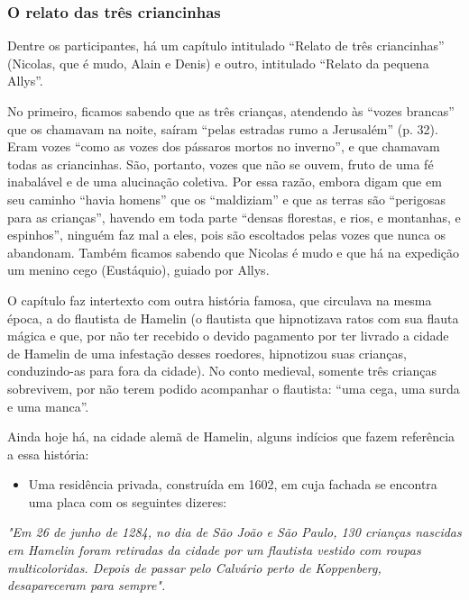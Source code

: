 \documentclass[12pt]{extarticle}
\begin{document}
\subsubsection{O relato das três criancinhas}

Dentre os participantes, há um capítulo intitulado ``Relato de três
criancinhas'' (Nicolas, que é mudo, Alain e Denis) e outro, intitulado
``Relato da pequena Allys''.

No primeiro, ficamos sabendo que as três crianças, atendendo às ``vozes
brancas'' que os chamavam na noite, saíram ``pelas estradas rumo a
Jerusalém'' (p. 32). Eram vozes ``como as vozes dos pássaros mortos no
inverno'', e que chamavam todas as criancinhas. São, portanto, vozes que
não se ouvem, fruto de uma fé inabalável e de uma alucinação coletiva.
Por essa razão, embora digam que em seu caminho ``havia homens'' que os
``maldiziam'' e que as terras são ``perigosas para as crianças'',
havendo em toda parte ``densas florestas, e rios, e montanhas, e
espinhos'', ninguém faz mal a eles, pois são escoltados pelas vozes que
nunca os abandonam. Também ficamos sabendo que Nicolas é mudo e que há
na expedição um menino cego (Eustáquio), guiado por Allys.

O capítulo faz intertexto com outra história famosa, que circulava na
mesma época, a do flautista de Hamelin (o flautista que hipnotizava
ratos com sua flauta mágica e que, por não ter recebido o devido
pagamento por ter livrado a cidade de Hamelin de uma infestação desses
roedores, hipnotizou suas crianças, conduzindo-as para fora da cidade).
No conto medieval, somente três crianças sobrevivem, por não terem
podido acompanhar o flautista: ``uma cega, uma surda e uma manca''.




Ainda hoje há, na cidade alemã de Hamelin, alguns indícios que fazem
referência a essa história:

\begin{itemize}
\item
  Uma residência privada, construída em 1602, em cuja fachada se
  encontra uma placa com os seguintes dizeres:
\end{itemize}

\emph{"Em 26 de junho de 1284, no dia de São João e São Paulo, 130
crianças nascidas em Hamelin foram retiradas da cidade por um flautista
vestido com roupas multicoloridas. Depois de passar pelo Calvário perto
de Koppenberg, desapareceram para sempre".}
\end{document}
